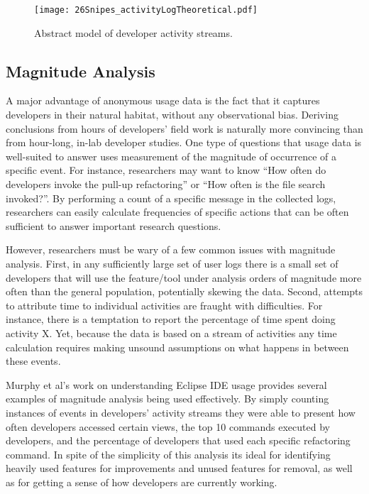 \begin{figure*}[t]
 \centering
\texttt{[image: 26Snipes\_activityLogTheoretical.pdf]}
\caption{Abstract model of developer activity streams.}
\label{fig:theoretical}
\end{figure*}



\subsection{Magnitude Analysis}

A major advantage of anonymous usage data is the fact that it captures developers in their natural habitat, without any observational bias. Deriving conclusions from hours of developers' field work is naturally more convincing than from hour-long, in-lab developer studies. One type of questions that usage data is well-suited to answer uses measurement of the magnitude of occurrence of a specific event. For instance, researchers may want to know ``How often do developers invoke the pull-up refactoring'' or ``How often is the file search invoked?''. By performing a count of a specific message in the collected logs, researchers can easily calculate frequencies of specific actions that can be often sufficient to answer important research questions. 

However, researchers must be wary of a few common issues with magnitude analysis. First, in any sufficiently large set of user logs there is a small set of developers that will use the feature/tool under analysis orders of magnitude more often than the general population, potentially skewing the data. 
Second, attempts to attribute time to individual activities are fraught with difficulties. For instance, there is a temptation to report the percentage of time spent doing activity X. Yet, because the data is based on a stream of activities any time calculation requires making unsound assumptions on what happens in between these events.

Murphy et al's work on understanding Eclipse IDE usage provides several examples of magnitude analysis being used effectively. By simply counting instances of events in developers' activity streams they were able to present how often developers accessed certain views, the top 10 commands executed by developers, and the percentage of developers that used each specific refactoring command. In spite of the simplicity of this analysis its ideal for identifying heavily used features for improvements and unused features for removal, as well as for getting a sense of how developers are currently working. 



